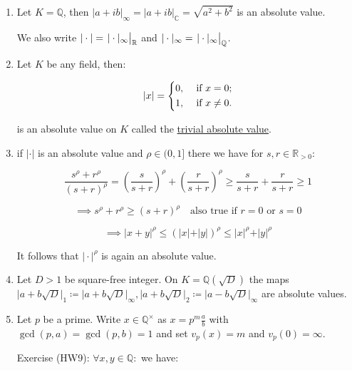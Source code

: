 \documentclass[openany]{amsbook}
\numberwithin{section}{chapter}
\theoremstyle{definition}
\begin{document}
\begin{enumerate}[label=\arabic*)]
    \item  Let \(K = \mathbb{Q}\), then \(\vert a + ib \vert _\infty = \vert a + ib \vert _\mathbb{C} = \sqrt{a^2 + b^2} \) is an absolute value.

We also write \(\vert \cdot \vert = \eval{\vert \cdot \vert_\infty}_\mathbb{R}\) and \(\vert \cdot \vert _\infty = \eval{\vert \cdot \vert _\infty}_\mathbb{Q}\).

    \item Let \(K\) be any field, then:
    
    \[
        \vert x \vert = \begin{dcases}
            0, &\text{ if } x=0 ;\\
            1, &\text{ if } x\neq 0.
        \end{dcases}
    \]

    is an absolute value on \(K\) called the \underline{trivial absolute value}.

    \item if \(\vert \cdot \vert\) is an absolute value and \(\rho \in (0,1]\) there we have for \(s,r\in \mathbb{R}_{>0}\):
    
    \[
        \frac{s^{\rho} + r^{\rho}}{(s+r)^{\rho }} = \left( \frac{s}{s+r} \right) ^ \rho + \left( \frac{r}{s+r} \right) ^ \rho \geq \frac{s}{s+r} + \frac{r}{s+r} \geq 1
    \]

    \[
        \implies s^{\rho} + r^{\rho} \geq (s+r)^{\rho} \quad \text{also true if \(r=0\) or \(s=0\)} 
    \]

    \[
        \implies \vert x+y \vert ^ \rho \leq (\vert x \vert + \vert y \vert)^{\rho} \leq  \vert x \vert ^ \rho + \vert y \vert ^ \rho
    \]

    It follows that \(\vert \cdot \vert ^ \rho\) is again an absolute value.

    \item Let \(D>1\) be square-free integer. On \(K = \mathbb{Q} (\sqrt{D})\) the maps \(\vert a + b \sqrt{D} \vert_1 \coloneqq \vert a + b \sqrt{D} \vert _\infty, \vert a + b \sqrt{D} \vert_2 \coloneqq \vert a-b \sqrt{D} \vert _\infty \) are absolute values.
    
    \item Let \(p\) be a prime. Write \(x\in\mathbb{Q}^\times\) as \(x = p^m \frac{a}{b}\) with \(\gcd(p,a)=\gcd(p,b)=1\) and set \(v_p(x) = m\) and \(v_p(0) = \infty\).
    
    Exercise (HW9): \(\forall x,y\in \mathbb{Q}:\) we have:


\end{enumerate}
\end{document}
